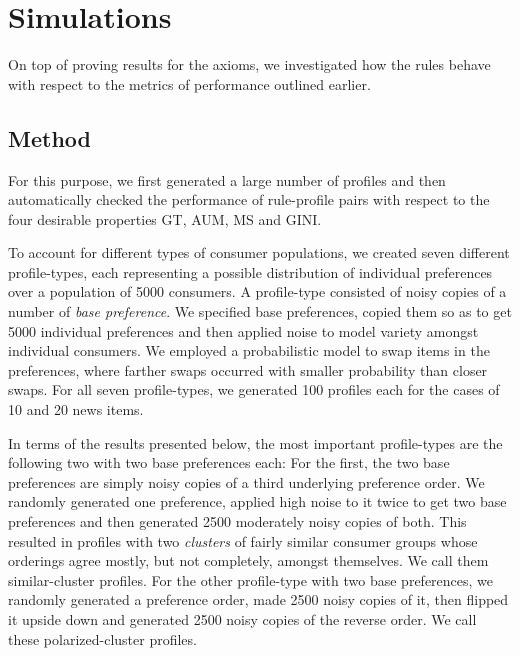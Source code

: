 \documentclass{article}
\begin{document}
\hypertarget{simulations}{\section{Simulations}}%
On top of proving results for the axioms, we investigated how the rules behave with respect to the metrics of performance outlined earlier.
\subsection{Method}
For this purpose, we first generated a large number of profiles and then automatically checked the performance of rule-profile pairs with respect to the four desirable properties GT, AUM, MS and GINI.

To account for different types of consumer populations, we created seven different profile-types, each representing a possible distribution of individual preferences over a population of 5000 consumers. A profile-type consisted of noisy copies of a number of \emph{base preference}. We specified base preferences, copied them so as to get 5000 individual preferences and then applied noise to model variety amongst individual consumers. We employed a probabilistic model to swap items in the preferences, where farther swaps occurred with smaller probability than closer swaps. For all seven profile-types, we generated 100 profiles each for the cases of 10 and 20 news items.

In terms of the results presented below, the most important profile-types are the following two with two base preferences each:
For the first, the two base preferences are simply noisy copies of a third underlying preference order. We randomly generated one preference, applied high noise to it twice to get two base preferences and then generated 2500 moderately noisy copies of both. This resulted in profiles with two \emph{clusters} of fairly similar consumer groups whose orderings agree mostly, but not completely, amongst themselves. We call them similar-cluster profiles.
For the other profile-type with two base preferences, we randomly generated a preference order, made 2500 noisy copies of it, then flipped it upside down and generated 2500 noisy copies of the reverse order. We call these polarized-cluster profiles.
\end{document}
